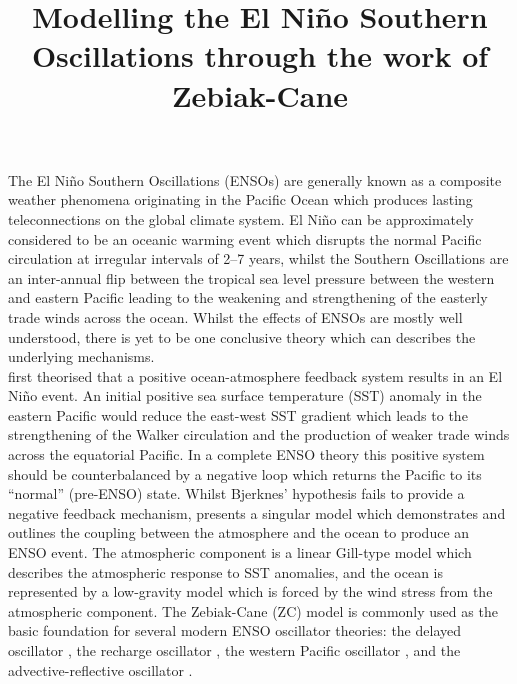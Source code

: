 \documentclass[12pt, onecolumn]{revtex4}    %
\begin{document}
                     

\title{Modelling the El Ni\~{n}o Southern Oscillations through the work of Zebiak-Cane} 

\maketitle
\thispagestyle{plain} %

The El Ni\~{n}o Southern Oscillations (ENSOs) are generally known as a composite weather phenomena originating in the Pacific Ocean which produces lasting teleconnections on the global climate system. El Ni\~{n}o can be approximately considered to be an oceanic warming event which disrupts the normal Pacific circulation at irregular intervals of 2--7 years, whilst the Southern Oscillations are an inter-annual flip between the tropical sea level pressure between the western and eastern Pacific leading to the weakening and strengthening of the easterly trade winds across the ocean. Whilst the effects of ENSOs are mostly well understood, there is yet to be one conclusive theory which can describes the underlying mechanisms. \\

\cite{doi:10.1175/1520-04931969097} first theorised that a positive ocean-atmosphere feedback system results in an El Ni\~{n}o event. An initial positive sea surface temperature (SST) anomaly in the eastern Pacific would reduce the east-west SST gradient which leads to the strengthening of the Walker circulation and the production of weaker trade winds across the equatorial Pacific. In a complete ENSO theory this positive system should be counterbalanced by a negative loop which returns the Pacific to its ``normal'' (pre-ENSO) state. Whilst Bjerknes' hypothesis fails to provide a negative feedback mechanism, \cite{Zebiak:1987aa} presents a singular model which demonstrates and outlines the coupling between the atmosphere and the ocean to produce an ENSO event. The atmospheric component is a linear Gill-type model \citep{Gill:1980aa} which describes the atmospheric response to SST anomalies, and the ocean is represented by a low-gravity model which is forced by the wind stress from the atmospheric component. The Zebiak-Cane (ZC) model is commonly used as the basic foundation for several modern ENSO oscillator theories: the delayed oscillator \citep{Suarez:1988aa, Battisti:1988aa}, the recharge oscillator \citep{Jin:1997aa}, the western Pacific oscillator \citep{Weisberg:1997aa, wang1999effects}, and the advective-reflective oscillator \citep{Picaut663}. \\
\end{document}
